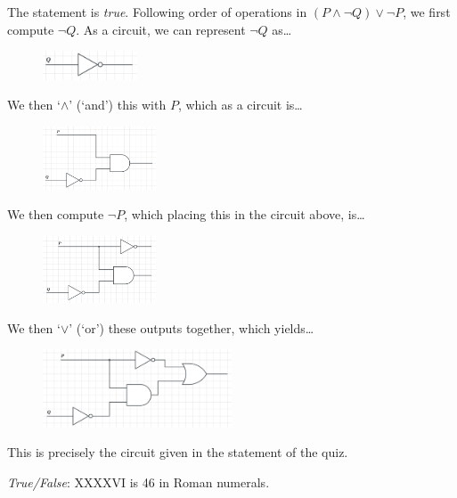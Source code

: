 \documentclass[11pt,letterpaper]{article}
\begin{document}
\sol The statement is \textit{true}. Following order of operations in $(P \wedge \neg Q) \vee \neg P$, we first compute $\neg Q$. As a circuit, we can represent $\neg Q$ as\dots
	\begin{figure}[H]
	\centering
	\includegraphics[width=0.25\textwidth]{images/negq}
	\end{figure}
We then `$\wedge$' (`and') this with $P$, which as a circuit is\dots
	\begin{figure}[H]
	\centering
	\includegraphics[width=0.3\textwidth]{images/negqand}
	\end{figure}
We then compute $\neg P$, which placing this in the circuit above, is\dots
	\begin{figure}[H]
	\centering
	\includegraphics[width=0.3\textwidth]{images/negqandnegp}
	\end{figure}
We then `$\vee$' (`or') these outputs together, which yields\dots
	\begin{figure}[H]
	\centering
	\includegraphics[width=0.5\textwidth]{images/qcircuit}
	\end{figure}
This is precisely the circuit given in the statement of the quiz. \pvspace{1.3cm}



\quizsol \textit{True/False}: XXXXVI is 46 in Roman numerals. \pspace
\end{document}
